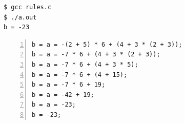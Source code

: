 \begin{frame}[fragile]\ft{\subsecname}


\pause \vspace{.1in}

\begin{lstlisting}[backgroundcolor=\color{red!10}]
$ gcc rules.c
$ ./a.out  
b = -23
\end{lstlisting}
\end{frame}

\begin{frame}[fragile]\ft{\subsecname}
\begin{lstlisting}[numbers=left,backgroundcolor=\color{red!10}]
b = a = -(2 + 5) * 6 + (4 + 3 * (2 + 3));
b = a = -7 * 6 + (4 + 3 * (2 + 3));
b = a = -7 * 6 + (4 + 3 * 5);
b = a = -7 * 6 + (4 + 15);
b = a = -7 * 6 + 19;
b = a = -42 + 19;
b = a = -23;
b = -23;
\end{lstlisting}
\end{frame}

